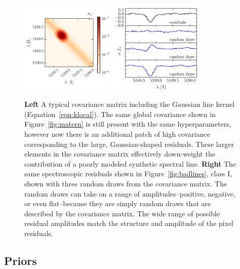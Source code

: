 \documentclass[iop,floatfix]{emulateapj}
\begin{document}
\begin{figure}[!t]
\begin{center}
\includegraphics[width=0.4\textwidth]{figs/gauss_matrix.pdf}
\includegraphics[width=0.4\textwidth]{figs/gauss_draw.pdf}
\caption{\textbf{Left} A typical covariance matrix including the Gaussian line kernel (Equation~\ref{eqn:klocal}). The same global covariance shown in Figure~\ref{fig:matern} is still present with the same hyperparameters, however now there is an additional patch of high covariance corresponding to the large, Gaussian-shaped residuals. These larger elements in the covariance matrix effectively down-weight the contribution of a poorly modeled synthetic spectral line.
\textbf{Right} The same spectroscopic residuals shown in Figure~\ref{fig:badlines}, class I, shown with three random draws from the covariance matrix. The random draws can take on a range of amplitudes--positive, negative, or even flat--because they are simply random draws that are described by the covariance matrix. The wide range of possible residual amplitudes match the structure and amplitude of the pixel residuals.}
\label{fig:region}
\end{center}
\end{figure}


\subsection{Priors} \label{subsec:priors}
\end{document}
